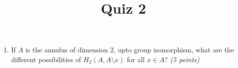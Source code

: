 \documentclass{article}
\title{Quiz 2}
\begin{document}
\maketitle
\begin{enumerate}
\item If $A$ is the annulus of dimension 2, upto group isomorphism, what are the different possibilities of $H_2(A,A\setminus x)$ for all $x \in A$? \emph{(5 points)}
\end{enumerate}
\end{document}
